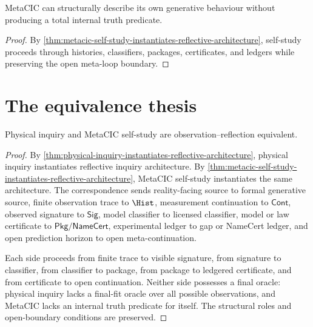 \begin{corollary}
\label{cor:metacic-self-study-structural-not-totalizing}
MetaCIC can structurally describe its own generative behaviour without producing a total internal truth predicate.
\end{corollary}

\begin{proof}
By \autoref{thm:metacic-self-study-instantiates-reflective-architecture}, self-study proceeds through histories, classifiers, packages, certificates, and ledgers while preserving the open meta-loop boundary.
\end{proof}

\section{The equivalence thesis}
\label{sec:observation-reflection-equivalence-thesis}

\begin{theorem}
\label{thm:physical-inquiry-metacic-reflective-architecture}
Physical inquiry and MetaCIC self-study are observation--reflection equivalent.
\end{theorem}

\begin{proof}
By \autoref{thm:physical-inquiry-instantiates-reflective-architecture}, physical inquiry instantiates reflective inquiry architecture. By \autoref{thm:metacic-self-study-instantiates-reflective-architecture}, MetaCIC self-study instantiates the same architecture. The correspondence sends reality-facing source to formal generative source, finite observation trace to $\Hist$, measurement continuation to $\mathsf{Cont}$, observed signature to $\mathsf{Sig}$, model classifier to licensed classifier, model or law certificate to $\mathsf{Pkg}/\mathsf{NameCert}$, experimental ledger to gap or NameCert ledger, and open prediction horizon to open meta-continuation.

Each side proceeds from finite trace to visible signature, from signature to classifier, from classifier to package, from package to ledgered certificate, and from certificate to open continuation. Neither side possesses a final oracle: physical inquiry lacks a final-fit oracle over all possible observations, and MetaCIC lacks an internal truth predicate for itself. The structural roles and open-boundary conditions are preserved.
\end{proof}

